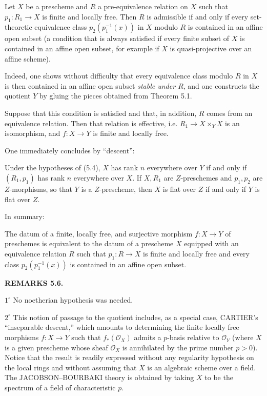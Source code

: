  Let $X$ be a prescheme and $R$ a pre-equivalence relation
on $X$ such that $p_1:R_1\to X$ is finite and locally free. Then $R$ is
admissible if and only if every set-theoretic equivalence class
$p_2(p_1^{-1}(x))$ in $X$ modulo $R$ is contained in an affine open subset
(a condition that is always satisfied if every finite subset of $X$ is
contained in an affine open subset, for example if $X$ is quasi-projective
over an affine scheme).

Indeed, one shows without difficulty that every equivalence class modulo $R$
in $X$ is then contained in an affine open subset \emph{stable under $R$}, and
one constructs the quotient $Y$ by gluing the pieces obtained from Theorem
5.1.

 Suppose that this condition is satisfied and that, in
addition, $R$ comes from an equivalence relation. Then that relation is
effective, i.e. $R_1\to X\times_Y X$ is an isomorphism, and $f:X\to Y$ is
finite and locally free.

One immediately concludes by ``descent'':

 Under the hypotheses of (5.4), $X$ has rank $n$
everywhere over $Y$ if and only if $(R_1,p_1)$ has rank $n$ everywhere over
$X$. If $X,R_1$ are $Z$-preschemes and $p_1,p_2$ are $Z$-morphisms, so that
$Y$ is a $Z$-prescheme, then $X$ is flat over $Z$ if and only if $Y$ is flat
over $Z$.

In summary:

 The datum of a finite, locally free, and surjective
morphism $f:X\to Y$ of preschemes is equivalent to the datum of a prescheme
$X$ equipped with an equivalence relation $R$ such that $p_1:R\to X$ is
finite and locally free and every class $p_2(p_1^{-1}(x))$ is contained in an
affine open subset.

\medskip
\noindent\textbf{REMARKS 5.6.}

\smallskip
\noindent $1^\circ$ No noetherian hypothesis was needed.

\smallskip
\noindent $2^\circ$ This notion of passage to the quotient includes, as a
special case, CARTIER's ``inseparable descent,'' which amounts to determining
the finite locally free morphisms $f:X\to Y$ such that $f_*(\mathcal O_X)$
admits a $p$-basis relative to $\mathcal O_Y$ (where $X$ is a given prescheme
whose sheaf $\mathcal O_X$ is annihilated by the prime number $p>0$). Notice
that the result is readily expressed without any regularity hypothesis on the
local rings and without assuming that $X$ is an algebraic scheme over a field.
The JACOBSON--BOURBAKI theory is obtained by taking $X$ to be the spectrum of
a field of characteristic $p$.

